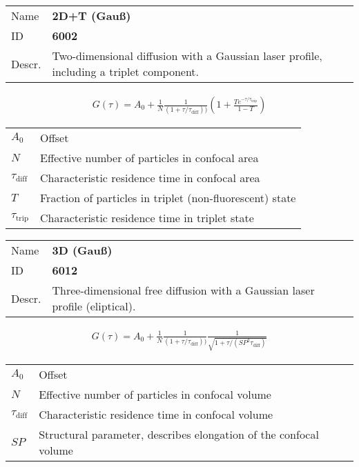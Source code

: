\noindent \begin{tabular}{lp{}}
Name & \textbf{2D+T (Gauß)} \\ 
ID & \textbf{6002} \\ 
Descr. &  Two-dimensional diffusion with a Gaussian laser profile, including a triplet component. \\ 
\end{tabular}
\begin{align}
G(\tau) = A_0 + \frac{1}{N} \frac{1}{(1+\tau/\tau_\mathrm{diff}))}  \left(1 + \frac{T e^{-\tau/\tau_\mathrm{trip}}}{1-T}  \right)
\end{align} 
\begin{center}
\begin{tabular}{ll}
$A_0$ & Offset \\ 
$N$ & Effective number of particles in confocal area \\ 
$\tau_\mathrm{diff}$ &  Characteristic residence time in confocal area \\ 
$T$ &  Fraction of particles in triplet (non-fluorescent) state\\ 
$\tau_\mathrm{trip}$ &  Characteristic residence time in triplet state \\ 
\end{tabular}
\end{center}
\vspace{2em}


\noindent \begin{tabular}{lp{}}
Name & \textbf{3D (Gauß)} \\ 
ID & \textbf{6012} \\ 
Descr. &  Three-dimensional free diffusion with a Gaussian laser profile (eliptical). \\ 
\end{tabular}
\begin{align}
G(\tau) = A_0 + \frac{1}{N} \frac{1}{(1+\tau/\tau_\mathrm{diff}))} \frac{1}{\sqrt{1+\tau/(\mathit{SP}^2 \tau_\mathrm{diff})}}
\end{align} 
\begin{center}
\begin{tabular}{ll}
$A_0$ & Offset \\ 
$N$ & Effective number of particles in confocal volume \\ 
$\tau_\mathrm{diff}$ &  Characteristic residence time in confocal volume \\ 
$\mathit{SP}$ & Structural parameter, describes elongation of the confocal volume \\
\end{tabular}
\end{center}
\vspace{2em}


